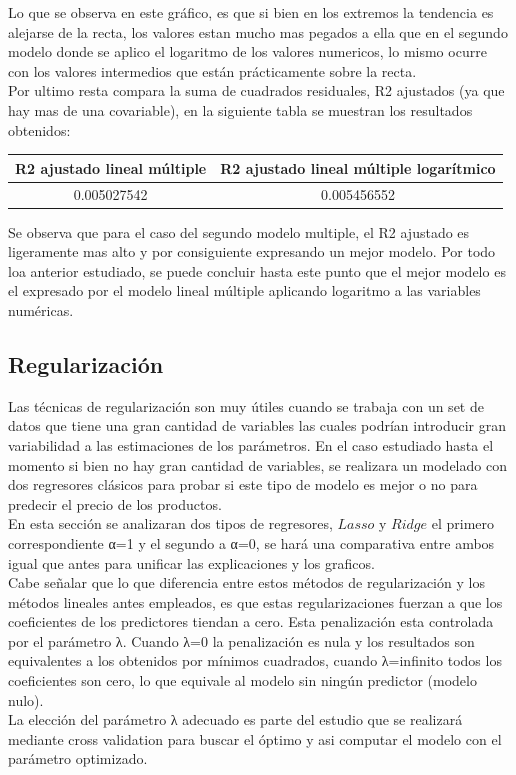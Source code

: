 Lo que se observa en este gráfico, es que si bien en los extremos la tendencia es alejarse de la recta, los valores estan mucho mas pegados a ella que en el segundo modelo donde se aplico el logaritmo de los valores numericos, lo mismo ocurre con los valores intermedios que están prácticamente sobre la recta. \\
Por ultimo resta compara la suma de cuadrados residuales, R2 ajustados (ya que hay mas de una covariable), en la siguiente tabla se muestran los resultados obtenidos:\\


\begin{center}
 \begin{tabular}{||c c||} 
 \hline
    R2 ajustado lineal múltiple & R2 ajustado lineal múltiple logarítmico \\ 
 \hline
 0.005027542 & 0.005456552 \\
 \hline
 \hline
\end{tabular}
\end{center}

Se observa que para el caso del segundo modelo multiple, el R2 ajustado es ligeramente mas alto y por consiguiente expresando un mejor modelo.
Por todo loa anterior estudiado, se puede concluir hasta este punto que el mejor modelo es el expresado por el modelo lineal múltiple aplicando logaritmo a las variables numéricas.






\subsection{Regularización}

Las técnicas de regularización son muy útiles cuando se trabaja con un set de datos que tiene una gran cantidad de variables las cuales podrían introducir gran variabilidad a las estimaciones de los parámetros. En el caso estudiado hasta el momento si bien no hay gran cantidad de variables, se realizara un modelado con dos regresores clásicos para probar si este tipo de modelo es mejor o no para predecir el precio de los productos.\\
En esta sección se analizaran dos tipos de regresores, $Lasso$ y $Ridge$ el primero correspondiente α=1 y el segundo a α=0, se hará una comparativa entre ambos igual que antes para unificar las explicaciones y los graficos.\\
Cabe señalar que lo que diferencia entre estos métodos de regularización y los métodos lineales antes empleados, es que estas regularizaciones fuerzan a que los coeficientes de los predictores tiendan a cero. Esta penalización esta controlada por el parámetro λ. Cuando λ=0 la penalización es nula y los resultados son equivalentes a los obtenidos por mínimos cuadrados, cuando λ=infinito todos los coeficientes son cero, lo que equivale al modelo sin ningún predictor (modelo nulo).\\
La elección del parámetro λ adecuado es parte del estudio que se realizará mediante cross validation para buscar el óptimo y asi computar el modelo con el parámetro optimizado.


